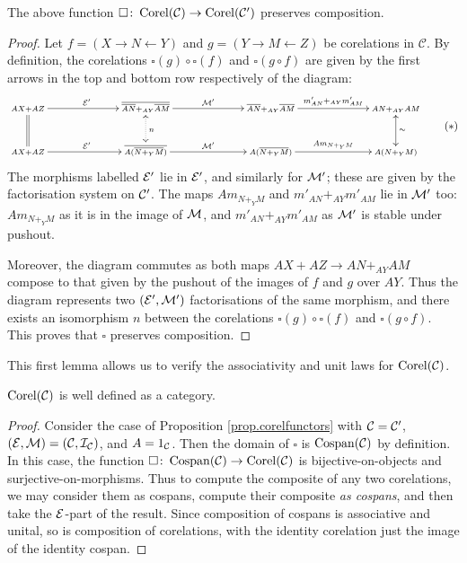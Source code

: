 \begin{lemma} \label{lem.corelfuncomposition}
  The above function $\square{\colon} \operatorname{{Corel}}(\mathcal C) \to \operatorname{{Corel}}(\mathcal C')$ preserves
  composition.
\end{lemma}
\begin{proof}
  Let $f = (X \longrightarrow N \longleftarrow Y)$ and $g= (Y \longrightarrow M
  \longleftarrow Z)$ be corelations in $\mathcal C$. By definition, the
  corelations $\square(g) \circ \square(f)$ and $\square(g \circ f)$ are given
  by the first arrows in the top and bottom row respectively of the diagram:
  \[ \label{diag.eparts}
    \begin{aligned}
      \xymatrixcolsep{5.5pc}
      \xymatrixrowsep{2pc}
      \xymatrix{
	\scriptstyle AX+AZ \ar[r]^{\mc E'} \ar@{=}[d] & \scriptstyle \overline{\overline{AN}+_{AY}\overline{AM}}
	\ar[r]^{\mc M'} \ar@{<.>}[d]^{n} & \scriptstyle \overline{AN}+_{AY}\overline{AM}
	\ar[r]^{m'_{AN}+_{AY}m'_{AM}} & \scriptstyle
	AN+_{AY}AM \\
	\scriptstyle AX+AZ \ar[r]^{\mc E'} & \scriptstyle \overline{A(\overline{N+_YM})} \ar[r]^{\mc M'} & \scriptstyle
	A(\overline{N+_YM}) \ar[r]^{Am_{N+_YM}} & \scriptstyle A(N+_YM) \ar@{<->}[u]_{\sim}
      }
    \end{aligned}
    \tag{$\ast$}
  \]
  The morphisms labelled $\mathcal E'$ lie in $\mathcal E'$, and similarly for $\mathcal M'$;
  these are given by the factorisation system on $\mathcal C'$.  The maps
  $Am_{N+_YM}$ and $m'_{AN}+_{AY}m'_{AM}$ lie in $\mathcal M'$ too: $Am_{N+_YM}$ as
  it is in the image of $\mathcal M$, and $m'_{AN}+_{AY}m'_{AM}$ as $\mathcal M'$ is
  stable under pushout. 

  Moreover, the diagram commutes as both maps $AX+AZ \to AN+_{AY}AM$ compose to
  that given by the pushout of the images of $f$ and $g$ over $AY$.  Thus the
  diagram represents two $(\mathcal E', \mathcal M')$ factorisations of the same morphism,
  and there exists an isomorphism $n$ between the corelations $\square(g) \circ
  \square(f)$ and $\square(g\circ f)$. This proves that $\square$ preserves
  composition.
\end{proof}
This first lemma allows us to verify the associativity and unit laws for
$\operatorname{{Corel}}(\mathcal C)$.
\begin{corollary}
  $\operatorname{{Corel}}(\mathcal C)$ is well defined as a category.
\end{corollary}
\begin{proof}
  Consider the case of Proposition \ref{prop.corelfunctors} with $\mathcal C = \mathcal
  C'$, $(\mathcal E,\mathcal M) = (\mathcal C, \mathcal I_{\mathcal C})$, and $A = 1_{\mathcal C}$. Then the
  domain of $\square$ is $\operatorname{{Cospan}}(\mathcal C)$ by definition. In this case, the
  function $\square{\colon} \operatorname{{Cospan}}(\mathcal C) \to \operatorname{{Corel}}(\mathcal C)$ is
  bijective-on-objects and surjective-on-morphisms. Thus to compute the
  composite of any two corelations, we may consider them as cospans, compute
  their composite \emph{as cospans}, and then take the $\mathcal E$-part of the
  result. Since composition of cospans is associative and unital, so is
  composition of corelations, with the identity corelation just the image of the
  identity cospan.
\end{proof}

